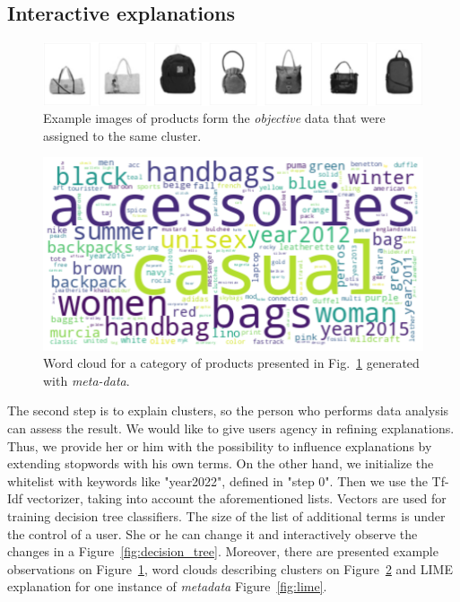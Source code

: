\documentclass[
 twocolumn,
 hf,
]{ceurart}
\begin{document}
\subsection{Interactive explanations}\label{subsec:interactive-explanations}
\begin{figure}[h!]
  \centering
  \includegraphics[width=\linewidth]{example1-clustering-products-fashion-tex/output_62_22}
  \caption{Example images of products form the \textit{objective} data that were assigned to the same cluster.}
  \label{fig:example_products}
\end{figure}

\begin{figure}[h!]
  \centering
  \includegraphics[width=\linewidth]{example1-clustering-products-fashion-tex/output_62_23}
  \caption{Word cloud for a category of products presented in Fig.~\ref{fig:example_products} generated with \textit{meta-data}.}
  \label{fig:wordcloud}
\end{figure}

The second step is to explain clusters, so the person who performs data analysis can assess the result.
We would like to give users agency in refining explanations.
Thus, we provide her or him with the possibility to influence explanations by extending stopwords with his own terms.
On the other hand, we initialize the whitelist with keywords like "year2022", defined in "step 0".
Then we use the Tf-Idf vectorizer, taking into account the aforementioned lists.
Vectors are used for training decision tree classifiers.
The size of the list of additional terms is under the control of a user.
She or he can change it and interactively observe the changes in a Figure~\ref{fig:decision_tree}.
Moreover, there are presented example observations on Figure~\ref{fig:example_products}, word clouds describing clusters on Figure~\ref{fig:wordcloud} and LIME~\cite{lime} explanation for one instance of \textit{metadata} Figure~\ref{fig:lime}.
\end{document}
